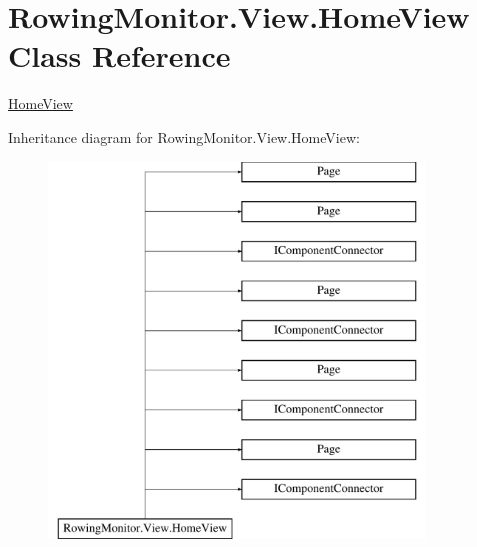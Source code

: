 \hypertarget{class_rowing_monitor_1_1_view_1_1_home_view}{}\section{Rowing\+Monitor.\+View.\+Home\+View Class Reference}
\label{class_rowing_monitor_1_1_view_1_1_home_view}


\hyperlink{class_rowing_monitor_1_1_view_1_1_home_view}{Home\+View}  


Inheritance diagram for Rowing\+Monitor.\+View.\+Home\+View\+:\begin{figure}[H]
\begin{center}
\leavevmode
\includegraphics[height=10.000000cm]{class_rowing_monitor_1_1_view_1_1_home_view}
\end{center}
\end{figure}
